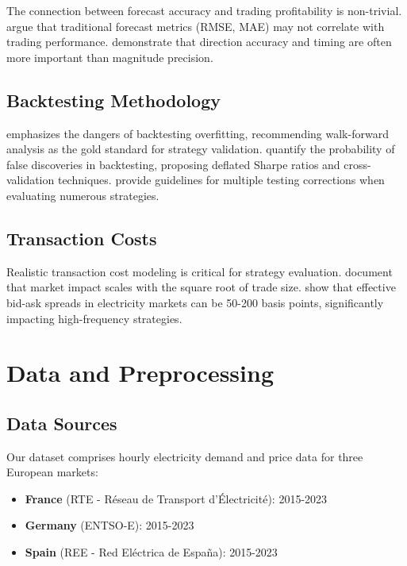 \documentclass[12pt,a4paper]{article}
\begin{document}
The connection between forecast accuracy and trading profitability is non-trivial. \cite{cerqueira2019evaluating} argue that traditional forecast metrics (RMSE, MAE) may not correlate with trading performance. \cite{gaillard2016additive} demonstrate that direction accuracy and timing are often more important than magnitude precision.

\subsection{Backtesting Methodology}

\cite{prado2018advances} emphasizes the dangers of backtesting overfitting, recommending walk-forward analysis as the gold standard for strategy validation. \cite{bailey2014pseudo} quantify the probability of false discoveries in backtesting, proposing deflated Sharpe ratios and cross-validation techniques. \cite{harvey2015backtesting} provide guidelines for multiple testing corrections when evaluating numerous strategies.

\subsection{Transaction Costs}

Realistic transaction cost modeling is critical for strategy evaluation. \cite{frazzini2012trading} document that market impact scales with the square root of trade size. \cite{hasbrouck2009trading} show that effective bid-ask spreads in electricity markets can be 50-200 basis points, significantly impacting high-frequency strategies.

\section{Data and Preprocessing}

\subsection{Data Sources}

Our dataset comprises hourly electricity demand and price data for three European markets:

\begin{itemize}
    \item \textbf{France} (RTE - Réseau de Transport d'Électricité): 2015-2023
    \item \textbf{Germany} (ENTSO-E): 2015-2023
    \item \textbf{Spain} (REE - Red Eléctrica de España): 2015-2023
\end{itemize}
\end{document}

